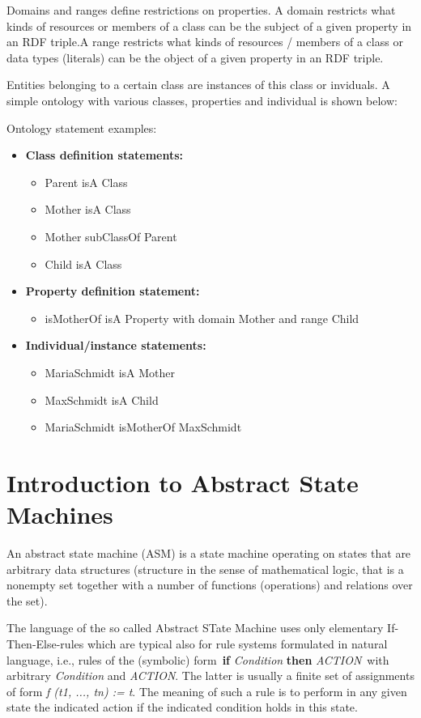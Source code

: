 Domains and ranges define restrictions on properties. A domain restricts what kinds of resources or members of a class can be the subject of a given property in an RDF triple.A range restricts what kinds of resources / members of a
class or data types (literals) can be the object of a given property in an RDF triple.

Entities belonging to a certain class are instances of this class or inviduals. A simple ontology with various classes, properties and individual is shown below:

Ontology statement examples:
\begin{itemize}
	\item \textbf {Class definition statements:}
	\begin{itemize}
		\item Parent isA Class
		\item Mother isA Class
		\item Mother subClassOf Parent
		\item Child isA Class
	\end{itemize}
	\item \textbf {Property definition statement:}
	\begin{itemize}
		\item isMotherOf isA Property with domain Mother and range Child
	\end{itemize}
	\item \textbf{Individual/instance statements:}
	\begin{itemize}
		\item MariaSchmidt isA Mother
		\item MaxSchmidt isA Child
		\item MariaSchmidt isMotherOf MaxSchmidt
	\end{itemize}
\end{itemize}

\section{Introduction to Abstract State Machines }

An abstract state machine (ASM) is a state machine operating on states that are arbitrary data structures (structure in the sense of mathematical logic, that is a nonempty set together with a number of functions (operations) and relations over the set).

The language of the so called Abstract STate Machine uses only elementary If-Then-Else-rules which are typical also for rule systems formulated in natural language, i.e., rules of the (symbolic) form\
\textbf{if} \textit{Condition} \textbf{then} \textit{ACTION}\
with arbitrary \textit{Condition} and \textit{ACTION}. The latter is usually a finite set of assignments of form \textit{f (t1, ..., tn) := t}. The meaning of such a rule is to perform in any given state the indicated action if the indicated condition holds in this state.\ 

